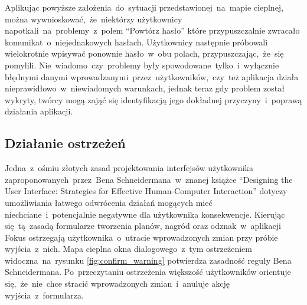 Aplikując powyższe założenia~do~sytuacji przedstawionej~na~mapie cieplnej, można wywnioskować,~że~niektórzy użytkownicy napotkali~na~problemy~z~polem ``Powtórz hasło'' które przypuszczalnie zwracało komunikat~o~niejednakowych hasłach. Użytkownicy następnie próbowali wielokrotnie wpisywać ponownie hasło~w~obu polach, przypuszczając,~że~się pomylili. Nie~wiadomo~czy~problemy były spowodowane~tylko~i~wyłącznie błędnymi danymi wprowadzanymi~przez~użytkowników,~czy~też aplikacja działa nieprawidłowo~w~niewiadomych warunkach, jednak teraz gdy problem został wykryty, twórcy mogą zająć się identyfikacją jego dokładnej przyczyny~i~poprawą działania aplikacji.

\bigskip
{}

\subsection{Działanie ostrzeżeń}
Jedna~z~ośmiu złotych zasad projektowania interfejsów użytkownika zaproponowanych~przez~Bena Schneidermana~w~znanej książce ``Designing the User Interface: Strategies for Effective Human-Computer Interaction'' \cite{Designing_IU} dotyczy umożliwiania łatwego odwrócenia działań mogących mieć niechciane~i~potencjalnie negatywne dla użytkownika konsekwencje. Kierując się~tą~zasadą formularze tworzenia planów, nagród oraz odznak~w~aplikacji Fokus ostrzegają użytkownika~o~utracie wprowadzonych zmian przy próbie wyjścia~z~nich. Mapa cieplna okna dialogowego~z~tym ostrzeżeniem widoczna~na~rysunku \ref{fig:confirm_warning} potwierdza zasadność reguły Bena Schneidermana. Po~przeczytaniu ostrzeżenia większość użytkowników orientuje się,~że~nie~chce stracić wprowadzonych zmian~i~anuluje akcję wyjścia~z~formularza.

\bigskip
{}
